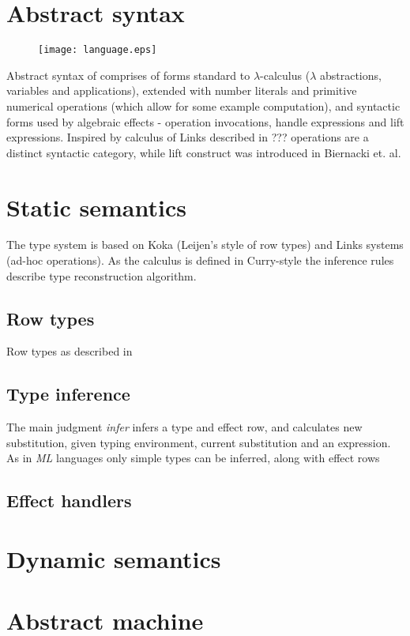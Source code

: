 \documentclass[inz, english, shortabstract]{iithesis}
\newcommand{\LC}{\(\lambda\)-calculus }
\begin{document}
\section{Abstract syntax}
\begin{figure}
  \centering
  \texttt{[image: language.eps]}
\end{figure}
Abstract syntax of comprises of forms standard to \LC ($\lambda$ abstractions, variables and applications), extended with number literals and primitive numerical operations (which allow for some example computation), and syntactic forms used by algebraic effects - operation invocations, handle expressions and lift expressions.
Inspired by calculus of Links described in ??? operations are a distinct syntactic category, while lift construct was introduced in Biernacki et. al. %

\section{Static semantics}
The type system is based on Koka (Leijen's style of row types) and Links systems (ad-hoc operations).
As the calculus is defined in Curry-style the inference rules describe type reconstruction algorithm.

\subsection{Row types}
Row types as described in \cite{Leijen2005}

\subsection{Type inference}
The main judgment \emph{infer} infers a type and effect row, and calculates new substitution, given typing environment, current substitution and an expression.
As in \emph{ML} languages only simple types can be inferred, along with effect rows 

\subsection{Effect handlers}


\section{Dynamic semantics}

\section{Abstract machine}
\end{document}
